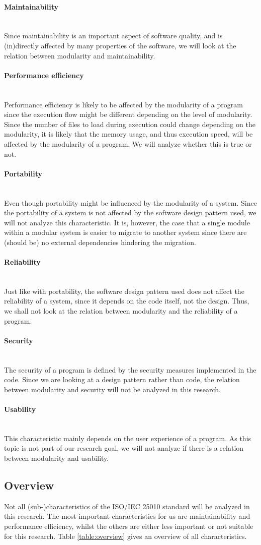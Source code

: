 \documentclass[twoside]{uva-inf-bachelor-thesis}
\newcommand{\myparagraph}[1]{\paragraph{#1}\mbox{}\\}
\begin{document}
\myparagraph{Maintainability}
Since maintainability is an important aspect of software quality, and is (in)directly affected by many properties of the software, we will look at the relation between modularity and maintainability.

\myparagraph{Performance efficiency}
Performance efficiency is likely to be affected by the modularity of a program since the execution flow might be different depending on the level of modularity. Since the number of files to load during execution could change depending on the modularity, it is likely that the memory usage, and thus execution speed, will be affected by the modularity of a program. We will analyze whether this is true or not.

\myparagraph{Portability}
Even though portability might be influenced by the modularity of a system. Since the portability of a system is not affected by the software design pattern used, we will not analyze this characteristic. It is, however, the case that a single module within a modular system is easier to migrate to another system since there are (should be) no external dependencies hindering the migration.

\myparagraph{Reliability}
Just like with portability, the software design pattern used does not affect the reliability of a system, since it depends on the code itself, not the design. Thus, we shall not look at the relation between modularity and the reliability of a program.

\myparagraph{Security}
The security of a program is defined by the security measures implemented in the code. Since we are looking at a design pattern rather than code, the relation between modularity and security will not be analyzed in this research.

\myparagraph{Usability}
This characteristic mainly depends on the user experience of a program. As this topic is not part of our research goal, we will not analyze if there is a relation between modularity and usability.

\subsection{Overview}
Not all (sub-)characteristics of the ISO/IEC 25010 standard will be analyzed in this research. The most important characteristics for us are maintainability and performance efficiency, whilst the others are either less important or not suitable for this research. Table \ref{table:overview} gives an overview of all characteristics.
\end{document}
